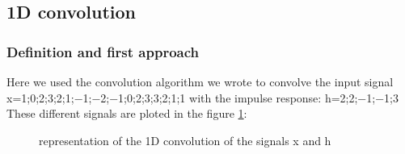 \documentclass[a4paper,10pt]{article}
\begin{document}
	
    \subsection{1D convolution}
	\subsubsection{Definition and first approach}
	Here we used the convolution algorithm we wrote to convolve the input signal  x={1;0;2;3;2;1;−1;−2;−1;0;2;3;3;2;1;1} with the impulse response: h={2;2;−1;−1;3}\newline
	These different signals are ploted in the figure \ref{1Dconvolution}:\newline
	\begin{figure}[!htb]\centering
	\begin{minipage}{0.45\textwidth\centering}
	  \caption{representation of the 1D convolution of the signals x and h}
	  \label{1Dconvolution}
	  \end{minipage}
	  \end{figure}
	  
\end{document}
